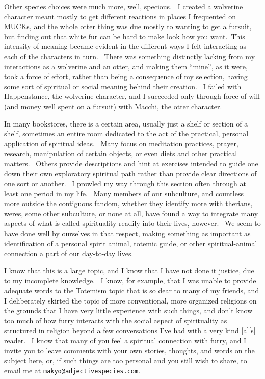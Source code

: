 Other species choices were much more, well, specious. ~I created a
wolverine character meant mostly to get different reactions in places I
frequented on MUCKs, and the whole otter thing was due mostly to wanting
to get a fursuit, but finding out that white fur can be hard to make
look how you want.~This intensity of meaning became evident in the
different ways I felt interacting as each of the characters in turn.
~There was something distinctly lacking from my interactions as a
wolverine and an otter, and making them ``mine'', as it were, took a
force of effort, rather than being a consequence of my selection, having
some sort of spiritual or social meaning behind their creation. ~I
failed with Happenstance, the wolverine character, and I succeeded only
through force of will (and money well spent on a fursuit) with Macchi,
the otter character.

In many bookstores, there is a certain area, usually just a shelf or
section of a shelf, sometimes an entire room dedicated to the act of the
practical, personal application of spiritual ideas. ~Many focus on
meditation practices, prayer, research, manipulation of certain objects,
or even diets and other practical matters. ~Others provide descriptions
and hint at exercises intended to guide one down their own exploratory
spiritual path rather than provide clear directions of one sort or
another. ~I prowled my way through this section often through at least
one period in my life. ~Many members of our subculture, and countless
more outside the contiguous fandom, whether they identify more with
therians, weres, some other subculture, or none at all, have found a way
to integrate many aspects of what is called spirituality readily into
their lives, however. ~We seem to have done well by ourselves in that
respect, making something as important as identification of a personal
spirit animal, totemic guide, or other spiritual-animal connection a
part of our day-to-day lives.

I know that this is a large topic, and I know that I have not done it
justice, due to my incomplete knowledge. ~I know, for example, that I
was unable to provide adequate words to the Totemism topic that is so
dear to many of my friends, and I deliberately skirted the topic of more
conventional, more organized religions on the grounds that I have very
little experience with such things, and don't know too much of how furry
interacts with the social aspect of spirituality as structured in
religion beyond a few conversations I've had with a very kind
{[}a{]}{[}s{]} reader. ~I
\href{http://adjectivespecies.com/2012/01/29/from-the-survey/}{know}
that many of you feel a spiritual connection with furry, and I invite
you to leave comments with your own stories, thoughts, and words on the
subject here, or, if such things are too personal and you still wish to
share, to email me at
\href{mailto:makyo@adjectivespecies.com}{\nolinkurl{makyo@adjectivespecies.com}}.
